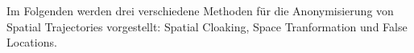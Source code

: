 Im Folgenden werden drei verschiedene Methoden für die Anonymisierung von Spatial Trajectories vorgestellt: Spatial Cloaking, Space Tranformation und False Locations.
